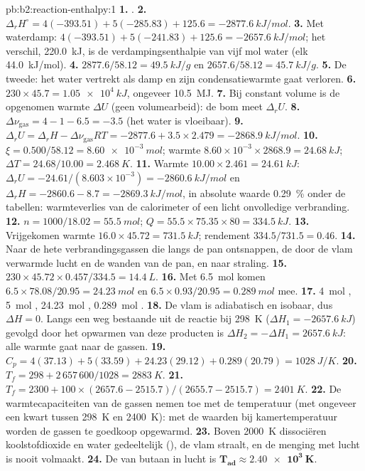 \begin{solution}{pb:b2:reaction-enthalpy:1}
\textbf{1.} .
\textbf{2.} $\Delta_r H^\circ = 4(-393.51) + 5(-285.83) + 125.6 =
\qty{-2877.6}{kJ/mol}$.
\textbf{3.} Met waterdamp: $4(-393.51) + 5(-241.83) + 125.6 =
\qty{-2657.6}{kJ/mol}$; het verschil, \qty{220.0}{kJ}, is de verdampingsenthalpie
van vijf mol water (elk \qty{44.0}{kJ/mol}).
\textbf{4.} $2877.6/58.12 = \qty{49.5}{kJ/g}$ en $2657.6/58.12 =
\qty{45.7}{kJ/g}$.
\textbf{5.} De tweede: het water vertrekt als damp en zijn condensatiewarmte
gaat verloren.
\textbf{6.} $230 \times 45.7 = \qty{1.05e4}{kJ}$, ongeveer \qty{10.5}{MJ}.
\textbf{7.} Bij constant volume is de opgenomen warmte $\Delta U$ (geen
volumearbeid): de bom meet $\Delta_r U$.
\textbf{8.} $\Delta\nu_{\text{gas}} = 4 - 1 - 6.5 = -3.5$ (het water is
vloeibaar).
\textbf{9.} $\Delta_r U = \Delta_r H - \Delta\nu_{\text{gas}}RT = -2877.6 +
3.5 \times 2.479 = \qty{-2868.9}{kJ/mol}$.
\textbf{10.} $\xi = 0.500/58.12 = \qty{8.60e-3}{mol}$; warmte $8.60 \times
10^{-3} \times 2868.9 = \qty{24.68}{kJ}$; $\Delta T = 24.68/10.00 =
\qty{2.468}{K}$.
\textbf{11.} Warmte $10.00 \times 2.461 = \qty{24.61}{kJ}$: $\Delta_r U =
-24.61/(8.603 \times 10^{-3}) = \qty{-2860.6}{kJ/mol}$ en $\Delta_r H =
-2860.6 - 8.7 = \qty{-2869.3}{kJ/mol}$, in absolute waarde \qty{0.29}{\percent} onder de
tabellen: warmteverlies van de calorimeter of een licht
onvolledige verbranding.
\textbf{12.} $n = 1000/18.02 = \qty{55.5}{mol}$; $Q = 55.5 \times 75.35
\times 80 = \qty{334.5}{kJ}$.
\textbf{13.} Vrijgekomen warmte $16.0 \times 45.72 = \qty{731.5}{kJ}$; rendement
$334.5/731.5 = 0.46$.
\textbf{14.} Naar de hete verbrandingsgassen die langs de pan ontsnappen, de
door de vlam verwarmde lucht en de wanden van de pan, en naar straling.
\textbf{15.} $230 \times 45.72 \times 0.457/334.5 = \qty{14.4}{L}$.
\textbf{16.} Met \qty{6.5}{mol}  komen $6.5 \times 78.08/20.95 =
\qty{24.23}{mol}$  en $6.5 \times 0.93/20.95 = \qty{0.289}{mol}$
 mee.
\textbf{17.} \qty{4}{mol} , \qty{5}{mol} ,
\qty{24.23}{mol} , \qty{0.289}{mol} .
\textbf{18.} De vlam is adiabatisch en isobaar, dus $\Delta H = 0$. Langs een
weg bestaande uit de reactie bij \qty{298}{K} ($\Delta H_1 =
\qty{-2657.6}{kJ}$) gevolgd door het opwarmen van deze producten is $\Delta H_2 =
-\Delta H_1 = \qty{+2657.6}{kJ}$: alle warmte gaat naar de gassen.
\textbf{19.} $C_p = 4(37.13) + 5(33.59) + 24.23(29.12) + 0.289(20.79) =
\qty{1028}{J/K}$.
\textbf{20.} $T_f = 298 + 2\,657\,600/1028 = \qty{2883}{K}$.
\textbf{21.} $T_f = 2300 + 100 \times (2657.6 - 2515.7)/(2655.7 - 2515.7) =
\qty{2401}{K}$.
\textbf{22.} De warmtecapaciteiten van de gassen nemen toe met de temperatuur (met
ongeveer een kwart tussen \qty{298}{K} en \qty{2400}{K}): met de waarden bij
kamertemperatuur worden de gassen te goedkoop opgewarmd.
\textbf{23.} Boven \qty{2000}{K} dissociëren koolstofdioxide en water gedeeltelijk
(), de vlam straalt, en de menging met lucht is nooit volmaakt.
\textbf{24.} De  van butaan in lucht is
$\boldsymbol{T_{\text{ad}} \approx \qty{2.40e3}{K}}$.
\end{solution}
